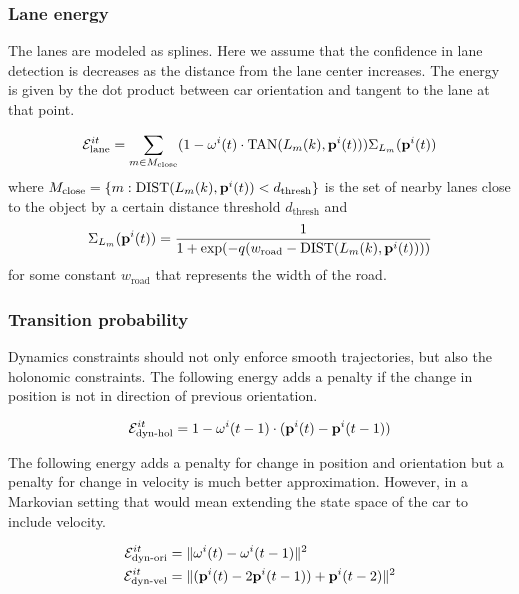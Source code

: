 \subsubsection{Lane energy}
\label{sec:laneEnergy}
 The lanes are modeled as splines. Here we assume that the confidence in lane
 detection is decreases as the distance from the lane center increases.  The
 energy is given by the dot product between car orientation and tangent to the
 lane at that point.

\begin{align}
  \label{eq:laneOrientationEnergy}
  \mathcal{E}^{it}_{\text{lane}} = 
  \sum_{m \in M_{\text{close}}}
  (1 - \mathbf{\omega}^{i}(t) \cdot \text{TAN}(L_{m}(k), \mathbf{p}^{i}({t})) )
\Sigma_{L_m}(\mathbf{p}^{i}({t}))
\end{align}
where $M_{\text{close}} = \{m : \text{DIST}(L_{m}(k), \mathbf{p}^{i}({t})) < d_{\text{thresh}}\} $ is
the set of nearby lanes close to the object by a certain distance threshold $d_{\text{thresh}}$ and 
\begin{align}
\Sigma_{L_m}(\mathbf{p}^{i}({t})) = 
  \frac{1}{1 + \exp(-q(w_{\text{road}} - \text{DIST}(L_{m}(k), \mathbf{p}^{i}({t}))))}
\end{align}
for some constant $w_{\text{road}}$ that represents the width of the road.

\subsubsection{Transition probability}
Dynamics constraints should not only enforce smooth trajectories, but also the
holonomic constraints.  The following energy adds a penalty if the change in
position is not in direction of previous orientation.

\begin{align}
  \label{eq:totalPosTransitionEnergy}
  \mathcal{E}^{it}_{\text{dyn-hol}} = 1 - \mathbf{\omega}^{i}(t-1) \cdot (\mathbf{p}^{i}({t}) - \mathbf{p}^{i}({t-1}))
\end{align}

The following energy adds a penalty for change in position and orientation
but a penalty for change in velocity is much better approximation. However, in
a Markovian setting that would mean extending the state space of the car to
include velocity.

\begin{align}
  \mathcal{E}^{it}_{\text{dyn-ori}} &= \|\mathbf{\omega}^{i}(t) - \mathbf{\omega}^{i}(t-1)\|^2\\
  \mathcal{E}^{it}_{\text{dyn-vel}} &= \|(\mathbf{p}^{i}({t}) - 2\mathbf{p}^{i}({t-1})) + \mathbf{p}^{i}({t-2})\|^2
\end{align}

